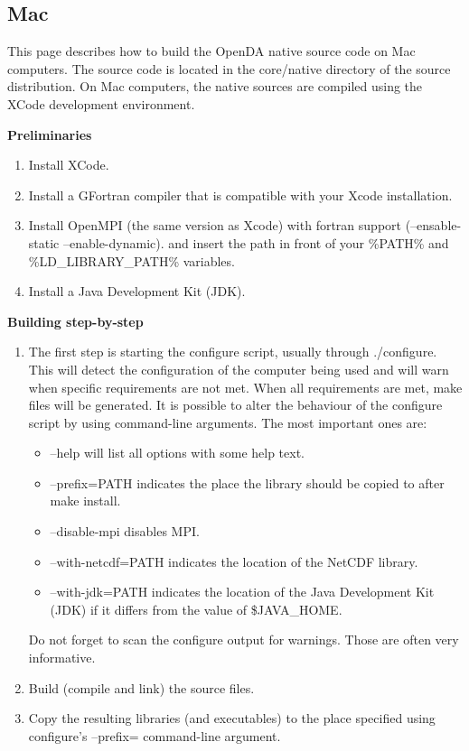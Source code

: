 \subsection{Mac}

This page describes how to build the OpenDA native source code on Mac computers. The source code is located in the core/native directory of the source distribution. On Mac computers, the native sources are compiled using the XCode development environment. 

\textbf{Preliminaries}

\begin{enumerate}
	\item Install XCode.
	\item Install a GFortran compiler that is compatible with your Xcode installation.
	\item Install OpenMPI (the same version as Xcode) with fortran support (--ensable-static --enable-dynamic). and insert the path in front of your \%PATH\% and \%LD\_LIBRARY\_PATH\% variables.
	\item Install a Java Development Kit (JDK).
\end{enumerate}

\textbf{Building step-by-step}

\begin{enumerate}
	\item The first step is starting the configure script, usually through ./configure. This will detect the configuration of the computer being used and will warn when specific requirements are not met. When all requirements are met, make files will be generated. It is possible to alter the behaviour of the configure script by using command-line arguments. The most important ones are: 
	\begin{itemize}
		\item --help will list all options with some help text.
		\item --prefix=PATH indicates the place the library should be copied to after make install.
		\item --disable-mpi disables MPI.
		\item --with-netcdf=PATH indicates the location of the NetCDF library.
		\item --with-jdk=PATH indicates the location of the Java Development Kit (JDK) if it differs from the value of \$JAVA\_HOME.
	\end{itemize}
	Do not forget to scan the configure output for warnings. Those are often very informative. 
	\item Build (compile and link) the source files.
	\item Copy the resulting libraries (and executables) to the place specified using configure's --prefix= command-line argument. 
\end{enumerate}

